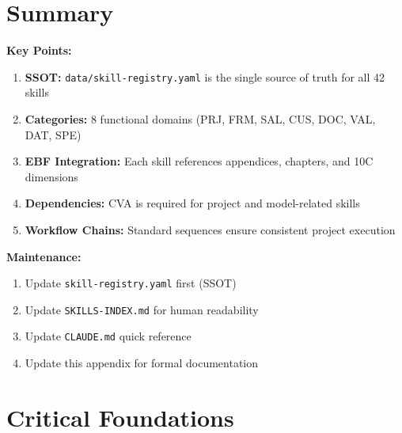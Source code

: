 
\section{Summary}
\label{sec:sk-summary}

\begin{tcolorbox}[colback=gray!10!white, colframe=gray!75!black,
    title=Summary: Skill Registry]

\textbf{Key Points:}
\begin{enumerate}
\item \textbf{SSOT:} \texttt{data/skill-registry.yaml} is the single source of truth for all 42 skills
\item \textbf{Categories:} 8 functional domains (PRJ, FRM, SAL, CUS, DOC, VAL, DAT, SPE)
\item \textbf{EBF Integration:} Each skill references appendices, chapters, and 10C dimensions
\item \textbf{Dependencies:} CVA is required for project and model-related skills
\item \textbf{Workflow Chains:} Standard sequences ensure consistent project execution
\end{enumerate}

\textbf{Maintenance:}
\begin{enumerate}
\item Update \texttt{skill-registry.yaml} first (SSOT)
\item Update \texttt{SKILLS-INDEX.md} for human readability
\item Update \texttt{CLAUDE.md} quick reference
\item Update this appendix for formal documentation
\end{enumerate}

\end{tcolorbox}


\section{Critical Foundations}
\label{sec:sk-foundations}


